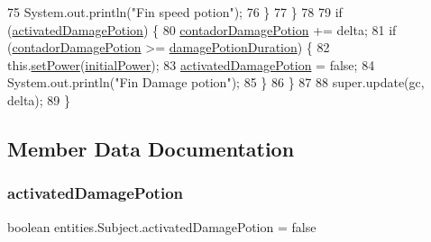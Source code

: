 \begin{DoxyCode}
75                 System.out.println(\textcolor{stringliteral}{"Fin speed potion"});
76             \}
77         \}
78 
79         \textcolor{keywordflow}{if} (\mbox{\hyperlink{classentities_1_1_subject_a3609265fa27777d39b14f1a7f9f7cbb3}{activatedDamagePotion}}) \{
80             \mbox{\hyperlink{classentities_1_1_subject_a549beb50154a4d53c53124ea79a4d740}{contadorDamagePotion}} += delta;
81             \textcolor{keywordflow}{if} (\mbox{\hyperlink{classentities_1_1_subject_a549beb50154a4d53c53124ea79a4d740}{contadorDamagePotion}} >= \mbox{\hyperlink{classentities_1_1_subject_a5f16593520da1120bdbf179d22af603b}{damagePotionDuration}}) \{
82                 this.\mbox{\hyperlink{classentities_1_1_subject_a5f56d102b27182353d53e68d7459273a}{setPower}}(\mbox{\hyperlink{classentities_1_1_subject_a3c94d6a59743309345b5da2ee7eeb0ec}{initialPower}});
83                 \mbox{\hyperlink{classentities_1_1_subject_a3609265fa27777d39b14f1a7f9f7cbb3}{activatedDamagePotion}} = \textcolor{keyword}{false};
84                 System.out.println(\textcolor{stringliteral}{"Fin Damage potion"});
85             \}
86         \}
87 
88         super.update(gc, delta);
89     \}
\end{DoxyCode}


\subsection{Member Data Documentation}
\mbox{\label{classentities_1_1_subject_a3609265fa27777d39b14f1a7f9f7cbb3}} 
\subsubsection{\texorpdfstring{activated\+Damage\+Potion}{activatedDamagePotion}}
{\footnotesize\ttfamily boolean entities.\+Subject.\+activated\+Damage\+Potion = false\hspace{0.3cm}{\ttfamily [private]}}

\mbox{\label{classentities_1_1_subject_a93bf55544d557dfedf72520adb83f164}} 
